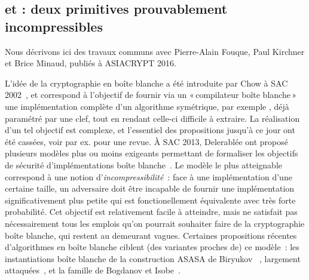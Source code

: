 \subsection{\pc et \cdb : deux primitives prouvablement incompressibles \cite{puppycipher}}

Nous décrivons ici des travaux communs avec Pierre-Alain Fouque, Paul Kirchner et Brice Minaud, publiés à ASIACRYPT 2016.

\medskip

L'idée de la cryptographie en boîte blanche a été introduite par Chow \etal à SAC 2002~\cite{DBLP:conf/sacrypt/ChowEJO02},
et correspond à l'objectif de fournir via un «\,compilateur boîte blanche\,» une implémentation complète d'un algorithme symétrique, par exemple \aes, déjà paramétré par
une clef, tout en rendant celle-ci difficile à extraire. La réalisation d'un tel objectif est complexe, et l'essentiel des propositions
jusqu'à ce jour ont été cassées, voir par ex. \cite{HenriWB} pour une revue.
À SAC 2013, Delerablée \etal ont proposé plusieurs modèles plus ou moins exigeants
permettant de formaliser les objectifs de sécurité d'implémentations boîte blanche~\cite{DBLP:conf/sacrypt/DelerableeLPR13}.
Le modèle le plus atteignable correspond à une notion d'\emph{incompressibilité}~: face à une implémentation d'une certaine taille, un adversaire doit être incapable de fournir une implémentation
significativement plus petite qui est fonctionellement équivalente avec très forte probabilité. Cet objectif est relativement facile à atteindre, mais ne satisfait pas nécessairement
tous les emplois qu'on pourrait souhaiter faire de la cryptographie boîte blanche, qui restent au demeurant vagues. Certaines propositions récentes d'algorithmes en boîte blanche ciblent
(des variantes proches de) ce modèle~: les instantiations boîte blanche de la construction ASASA de Biryukov \etal~\cite{DBLP:conf/asiacrypt/BiryukovBK14},
largement attaquées~\cite{DBLP:journals/iacr/DinurDKL15,DBLP:conf/asiacrypt/MinaudDFK15}, et la famille \spacehard de Bogdanov et Isobe~\cite{DBLP:conf/ccs/BogdanovI15}.

